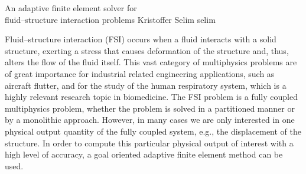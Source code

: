               {An adaptive finite element solver for \\fluid--structure interaction problems}
              {Kristoffer Selim}
              {selim}
\newcommand{\subdt}{\textrm{d}_t}
\newcommand{\divv}{\textrm{div}\;}
\newcommand{\Divv}{\textrm{Div}\;}
\newcommand{\uF}{u_{_{F}}}
\newcommand{\dotuF}{\dot{u}_{_{F}}}
\newcommand{\pF}{p_{_{F}}}
\newcommand{\rhoF}{\rho_{_{F}}}
\newcommand{\sigmaF}{\sigma_{_{F}}}
\newcommand{\sigmaFup}{\sigma_{_{F}}(u_{_{F}}, p_{_{F}})}
\newcommand{\sigmaS}{\sigma_{_{S}}}
\newcommand{\bff}{b_{_{F}}}
\newcommand{\graduF}{\textrm{grad}\;u_{_{F}}}
\newcommand{\US}{U_{_{S}}}
\newcommand{\uS}{u_{_{S}}}
\newcommand{\GradUS}{\textrm{Grad}\;U_{_{S}}}
\newcommand{\ddotUS}{\ddot{U}_{_{S}}}
\newcommand{\ddotuS}{\ddot{u}_{_{S}}}
\newcommand{\PS}{P_{_{S}}}
\newcommand{\rhoS}{\rho_{_{S}}}
\newcommand{\SigmaS}{\Sigma_{_{S}}}
\newcommand{\SigmaSU}{\Sigma_{_{S}}(U_{_{S}})}
\newcommand{\BS}{B_{_{S}}}
\newcommand{\M}{\mathcal{M}}
\newcommand{\E}{\mathcal{E}}
\newcommand{\oF}{\omega_{_{F}}}
\newcommand{\oS}{\omega_{_{S}}}
\newcommand{\OS}{\Omega_{_{S}}}
\newcommand{\OF}{\Omega_{_{F}}}
\newcommand{\PhiS}{\Phi_{_{S}}}
\newcommand{\PhiM}{\Phi_{_{M}}}
\newcommand{\FS}{F_{_{S}}}
\newcommand{\UM}{U_{_{M}}}
\newcommand{\SigmaM}{\Sigma_{_{M}}}
\newcommand{\GradUM}{\textrm{Grad}\;U_{_{M}}}
\newcommand{\UF}{U_{_{F}}}
\newcommand{\PF}{P_{_{F}}}
\newcommand{\AFF}{A_{_{FF}}}
\newcommand{\AFS}{A_{_{FS}}}
\newcommand{\AFM}{A_{_{FM}}}
\newcommand{\ASS}{A_{_{SS}}}
\newcommand{\ASF}{A_{_{SF}}}
\newcommand{\ASM}{A_{_{SM}}}
\newcommand{\AMM}{A_{_{MM}}}
\newcommand{\AMF}{A_{_{MF}}}
\newcommand{\AMS}{A_{_{MS}}}

Fluid--structure interaction (FSI) occurs when a fluid interacts with
a solid structure, exerting a stress that causes deformation of the
structure and, thus, alters the flow of the fluid itself. This vast
category of multiphysics problems are of great importance for
industrial related engineering applications, such as aircraft flutter,
and for the study of the human respiratory system, which is a
highly relevant research topic in biomedicine. The FSI problem is a
fully coupled multiphysics problem, whether the problem is solved in a
partitioned manner or by a monolithic approach. However, in
many cases we are only interested in one physical output quantity of
the fully coupled system, e.g., the displacement of the structure. In
order to compute this particular physical output of interest with a
high level of accuracy, a goal oriented adaptive finite element method
can be used.


